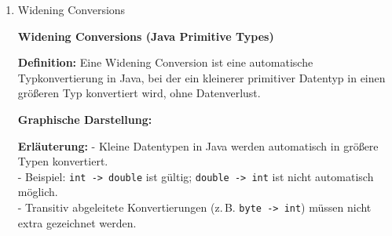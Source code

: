 \documentclass[12pt]{scrartcl}
\begin{document}
\begin{enumerate}
	\item Widening Conversions
    



    \textbf{Widening Conversions (Java Primitive Types)}

\textbf{Definition:} Eine Widening Conversion ist eine automatische Typkonvertierung in Java, bei der ein kleinerer primitiver Datentyp in einen größeren Typ konvertiert wird, ohne Datenverlust.

\textbf{Graphische Darstellung:}




\textbf{Erläuterung:}  
- Kleine Datentypen in Java werden automatisch in größere Typen konvertiert. \\ 
- Beispiel: \texttt{int -> double} ist gültig; \texttt{double -> int} ist nicht automatisch möglich.  \\
- Transitiv abgeleitete Konvertierungen (z.\,B. \texttt{byte -> int}) müssen nicht extra gezeichnet werden.
    
    
\end{enumerate}
\newpage
\end{document}
